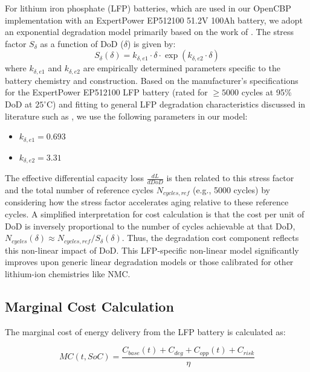\documentclass[11pt,a4paper]{article}
\begin{document}
For lithium iron phosphate (LFP) batteries, which are used in our OpenCBP implementation with an ExpertPower EP512100 51.2V 100Ah battery, we adopt an exponential degradation model primarily based on the work of \citet{Millner2010}. The stress factor $S_{\delta}$ as a function of DoD ($\delta$) is given by:
\begin{equation}
S_{\delta}(\delta) = k_{\delta,e1} \cdot \delta \cdot \exp(k_{\delta,e2} \cdot \delta)
\end{equation}
where $k_{\delta,e1}$ and $k_{\delta,e2}$ are empirically determined parameters specific to the battery chemistry and construction. Based on the manufacturer's specifications for the ExpertPower EP512100 LFP battery (rated for $\geq 5000$ cycles at  95\% DoD at $25^\circ$C) and fitting to general LFP degradation characteristics discussed in literature such as \citet{Millner2010}, we use the following parameters in our model:
\begin{itemize}
    \item $k_{\delta,e1} = 0.693$
    \item $k_{\delta,e2} = 3.31$
\end{itemize}
The effective differential capacity loss $\frac{dL}{dDoD}$ is then related to this stress factor and the total number of reference cycles $N_{cycles,ref}$ (e.g., 5000 cycles) by considering how the stress factor accelerates aging relative to these reference cycles. A simplified interpretation for cost calculation is that the cost per unit of DoD is inversely proportional to the number of cycles achievable at that DoD, $N_{cycles}(\delta) \approx N_{cycles,ref} / S_{\delta}(\delta)$. Thus, the degradation cost component reflects this non-linear impact of DoD. This LFP-specific non-linear model significantly improves upon generic linear degradation models or those calibrated for other lithium-ion chemistries like NMC.

\subsection{Marginal Cost Calculation}
The marginal cost of energy delivery from the LFP battery is calculated as:

\begin{equation}
MC(t, SoC) = \frac{C_{base}(t) + C_{deg} + C_{opp}(t) + C_{risk}}{\eta}
\end{equation}
\end{document}
